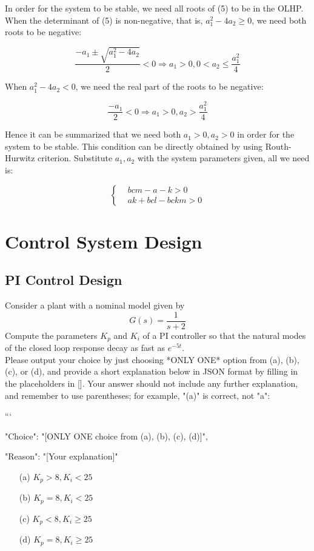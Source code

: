 \documentclass[12pt]{article}
\begin{document}
In order for the system to be stable, we need all roots of (5) to be in the OLHP. When the determinant of (5) is non-negative, that is, $a_{1}^{2}-4 a_{2} \geq 0$, we need both roots to be negative:

$$
\frac{-a_{1} \pm \sqrt{a_{1}^{2}-4 a_{2}}}{2}<0 \Rightarrow a_{1}>0,0<a_{2} \leq \frac{a_{1}^{2}}{4}
$$

When $a_{1}^{2}-4 a_{2}<0$, we need the real part of the roots to be negative:

$$
\frac{-a_{1}}{2}<0 \Rightarrow a_{1}>0, a_{2}>\frac{a_{1}^{2}}{4}
$$

Hence it can be summarized that we need both $a_{1}>0, a_{2}>0$ in order for the system to be stable. This condition can be directly obtained by using Routh-Hurwitz criterion. Substitute $a_{1}, a_{2}$ with the system parameters given, all we need is:

$$
\left\{\begin{aligned}
& b c m-a-k>0 \\
& a k+b c l-b c k m>0
\end{aligned}\right.
$$
\clearpage

\section{Control System Design}
\subsection{PI Control Design}
Consider a plant with a nominal model given by
\begin{equation}
G(s) = \frac{1}{s + 2}
\end{equation}
Compute the parameters \(K_p\) and \(K_i\) of a PI controller so that the natural modes of the closed loop response decay as fast as \(e^{-5t}\). \\
Please output your choice by just choosing *ONLY ONE* option from (a), (b), (c), or (d), and provide a short explanation below in JSON format by filling in the placeholders in []. Your answer should not include any further explanation, and remember to use parentheses; for example, "(a)" is correct, not "a":

```
{

"Choice": "[ONLY ONE choice from (a), (b), (c), (d)]",

"Reason": "[Your explanation]"

}

\begin{itemize}
    \item[(a)] \(K_p > 8, K_i < 25\)
    \item[(b)] \(K_p = 8, K_i < 25\)
    \item[(c)] \(K_p < 8, K_i \geq 25\)
    \item[(d)] \(K_p = 8, K_i \geq 25\)
\end{itemize}
\end{document}
